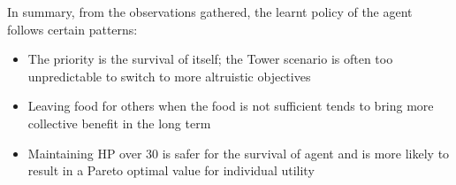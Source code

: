 In summary, from the observations gathered, the learnt policy of the agent follows certain patterns:
\begin{itemize}
	\item The priority is the survival of itself; the Tower scenario is often too unpredictable to switch to more altruistic objectives
	\item Leaving food for others when the food is not sufficient tends to bring more collective benefit in the long term
	\item Maintaining HP over 30 is safer for the survival of agent and is more likely to result in a Pareto optimal value for individual utility
\end{itemize}


